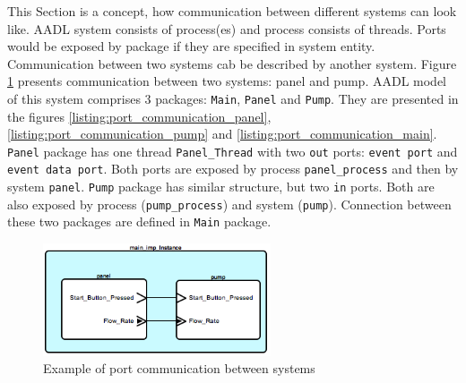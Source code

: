 This Section is a concept, how communication between different systems can look like. AADL system consists of process(es) and process consists of threads. Ports would be exposed by package if they are specified in system entity. Communication between two systems cab be described by another system. Figure \ref{figure:port_communication} presents communication between two systems: panel and pump. AADL model of this system comprises 3 packages: \lstinline{Main}, \lstinline{Panel} and \lstinline{Pump}. They are presented in the figures \ref{listing:port_communication_panel}, \ref{listing:port_communication_pump} and \ref{listing:port_communication_main}. \lstinline{Panel} package has one thread \lstinline{Panel_Thread} with two \lstinline{out} ports: \lstinline{event port} and \lstinline{event data port}. Both ports are exposed by process \lstinline{panel_process} and then by system \lstinline{panel}. \lstinline{Pump} package has similar structure, but two \lstinline{in} ports. Both are also exposed by process (\lstinline{pump_process}) and system (\lstinline{pump}). Connection between these two packages are defined in \lstinline{Main} package.

\begin{figure}[ht]%
    \begin{center}
    	\includegraphics[width=0.6\textwidth]{figures/port-communication.png}    	
    \end{center}
    \caption{Example of port communication between systems}
    \label{figure:port_communication}
\end{figure}

